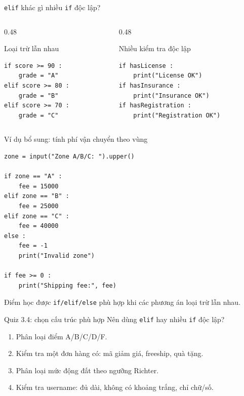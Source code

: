 \documentclass[aspectratio=169,11pt]{beamer}
\newcommand{\code}[1]{\texttt{#1}}
\begin{document}
\begin{frame}[fragile]{\texttt{elif} khác gì nhiều \texttt{if} độc lập?}
\begin{columns}[T]
\begin{column}{0.48\textwidth}
\begin{block}{Loại trừ lẫn nhau}
\begin{lstlisting}[style=py]
if score >= 90 :
    grade = "A"
elif score >= 80 :
    grade = "B"
elif score >= 70 :
    grade = "C"
\end{lstlisting}
\end{block}
\end{column}
\begin{column}{0.48\textwidth}
\begin{block}{Nhiều kiểm tra độc lập}
\begin{lstlisting}[style=py]
if hasLicense :
    print("License OK")
if hasInsurance :
    print("Insurance OK")
if hasRegistration :
    print("Registration OK")
\end{lstlisting}
\end{block}
\end{column}
\end{columns}
\end{frame}



\begin{frame}[fragile]{Ví dụ bổ sung: tính phí vận chuyển theo vùng}
\begin{lstlisting}[style=py]
zone = input("Zone A/B/C: ").upper()

if zone == "A" :
    fee = 15000
elif zone == "B" :
    fee = 25000
elif zone == "C" :
    fee = 40000
else :
    fee = -1
    print("Invalid zone")

if fee >= 0 :
    print("Shipping fee:", fee)
\end{lstlisting}
\begin{block}{Điểm học được}
\code{if/elif/else} phù hợp khi các phương án loại trừ lẫn nhau.
\end{block}
\end{frame}

\begin{frame}{Quiz 3.4: chọn cấu trúc phù hợp}
Nên dùng \code{elif} hay nhiều \code{if} độc lập?
\begin{enumerate}
  \item Phân loại điểm A/B/C/D/F.
  \item Kiểm tra một đơn hàng có: mã giảm giá, freeship, quà tặng.
  \item Phân loại mức động đất theo ngưỡng Richter.
  \item Kiểm tra username: đủ dài, không có khoảng trắng, chỉ chữ/số.
\end{enumerate}
\end{frame}
\end{document}
